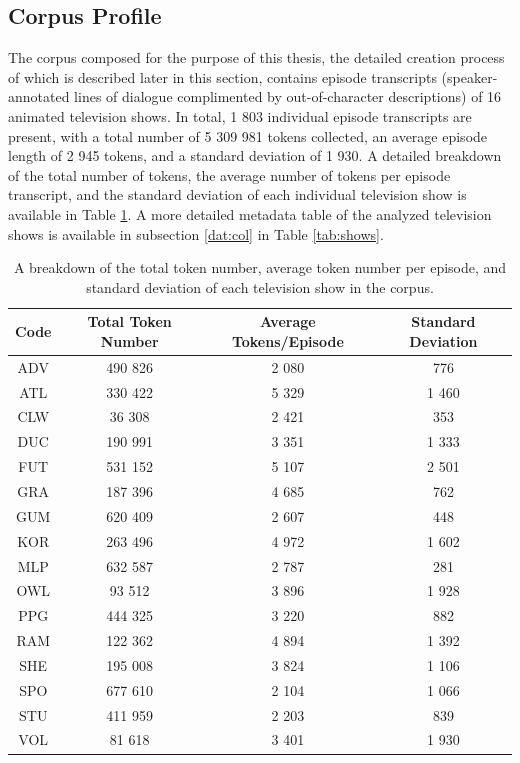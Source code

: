 \documentclass[a4paper, 11pt]{article}
\begin{document}
\subsection{Corpus Profile}
The corpus composed for the purpose of this thesis, the detailed creation process of which is described later in this section, contains episode transcripts (speaker-annotated lines of dialogue complimented by out-of-character descriptions) of 16 animated television shows. In total, 1 803 individual episode transcripts are present, with a total number of 5 309 981 tokens collected, an average episode length of 2 945 tokens, and a standard deviation of 1 930. A detailed breakdown of the total number of tokens, the average number of tokens per episode transcript, and the standard deviation of each individual television show is available in Table \ref{tab:corpus}. A more detailed metadata table of the analyzed television shows is available in subsection \ref{dat:col} in Table \ref{tab:shows}.

\begin{table}[h!]
\centering
  \begin{small}
  \begin{tabular}{|| c | c | c | c ||}
  \hline
  Code & Total Token Number & Average Tokens/Episode & Standard Deviation \\
  \hline\hline
  ADV & 490 826 & 2 080 & 776 \\
  \hline
  ATL & 330 422 & 5 329 & 1 460 \\
  \hline
  CLW & 36 308 & 2 421 & 353 \\
  \hline
  DUC & 190 991 & 3 351 & 1 333 \\
  \hline
  FUT & 531 152 & 5 107 & 2 501 \\
  \hline
  GRA & 187 396 & 4 685 & 762 \\
  \hline
  GUM & 620 409 & 2 607 & 448 \\
  \hline
  KOR & 263 496 & 4 972 & 1 602 \\
  \hline
  MLP & 632 587 & 2 787 & 281 \\
  \hline
  OWL & 93 512 & 3 896 & 1 928 \\
  \hline
  PPG & 444 325 & 3 220 & 882 \\
  \hline
  RAM & 122 362 & 4 894 & 1 392 \\
  \hline
  SHE & 195 008 & 3 824 & 1 106 \\
  \hline
  SPO & 677 610 & 2 104 & 1 066 \\
  \hline
  STU & 411 959 & 2 203 & 839 \\
  \hline
  VOL & 81 618 & 3 401 & 1 930 \\
  \hline
  \end{tabular}
  \end{small}
  \caption{A breakdown of the total token number, average token number per episode, and standard deviation of each television show in the corpus.}
  \label{tab:corpus}
\end{table}
\end{document}
